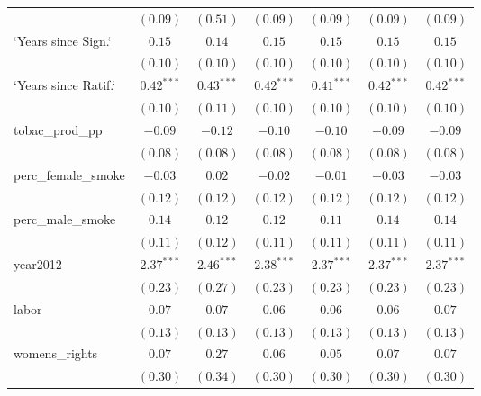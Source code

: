 \begin{table}[!h]
\begin{center}
\begin{tabular}{l c c c c c c }
                        & $(0.09)$     & $(0.51)$     & $(0.09)$     & $(0.09)$     & $(0.09)$     & $(0.09)$     \\
`Years since Sign.`     & $0.15$       & $0.14$       & $0.15$       & $0.15$       & $0.15$       & $0.15$       \\
                        & $(0.10)$     & $(0.10)$     & $(0.10)$     & $(0.10)$     & $(0.10)$     & $(0.10)$     \\
`Years since Ratif.`    & $0.42^{***}$ & $0.43^{***}$ & $0.42^{***}$ & $0.41^{***}$ & $0.42^{***}$ & $0.42^{***}$ \\
                        & $(0.10)$     & $(0.11)$     & $(0.10)$     & $(0.10)$     & $(0.10)$     & $(0.10)$     \\
tobac\_prod\_pp         & $-0.09$      & $-0.12$      & $-0.10$      & $-0.10$      & $-0.09$      & $-0.09$      \\
                        & $(0.08)$     & $(0.08)$     & $(0.08)$     & $(0.08)$     & $(0.08)$     & $(0.08)$     \\
perc\_female\_smoke     & $-0.03$      & $0.02$       & $-0.02$      & $-0.01$      & $-0.03$      & $-0.03$      \\
                        & $(0.12)$     & $(0.12)$     & $(0.12)$     & $(0.12)$     & $(0.12)$     & $(0.12)$     \\
perc\_male\_smoke       & $0.14$       & $0.12$       & $0.12$       & $0.11$       & $0.14$       & $0.14$       \\
                        & $(0.11)$     & $(0.12)$     & $(0.11)$     & $(0.11)$     & $(0.11)$     & $(0.11)$     \\
year2012                & $2.37^{***}$ & $2.46^{***}$ & $2.38^{***}$ & $2.37^{***}$ & $2.37^{***}$ & $2.37^{***}$ \\
                        & $(0.23)$     & $(0.27)$     & $(0.23)$     & $(0.23)$     & $(0.23)$     & $(0.23)$     \\
labor                   & $0.07$       & $0.07$       & $0.06$       & $0.06$       & $0.06$       & $0.07$       \\
                        & $(0.13)$     & $(0.13)$     & $(0.13)$     & $(0.13)$     & $(0.13)$     & $(0.13)$     \\
womens\_rights          & $0.07$       & $0.27$       & $0.06$       & $0.05$       & $0.07$       & $0.07$       \\
                        & $(0.30)$     & $(0.34)$     & $(0.30)$     & $(0.30)$     & $(0.30)$     & $(0.30)$     \\

\end{tabular}
\end{center}
\end{table}
